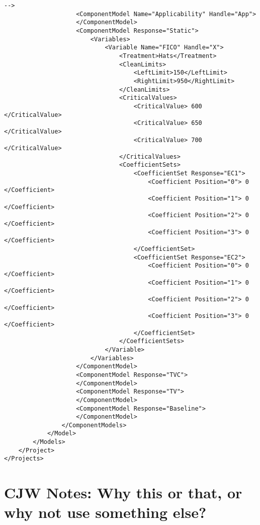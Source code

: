 \documentclass[10pt]{article}
\begin{document}
\begin{Verbatim}[fontsize=\small,baselinestretch=0.75,formatcom=\color{red}]
                    -->
                    <ComponentModel Name="Applicability" Handle="App">
                    </ComponentModel>
                    <ComponentModel Response="Static">
                        <Variables>
                            <Variable Name="FICO" Handle="X">
                                <Treatment>Hats</Treatment>
                                <CleanLimits>
                                    <LeftLimit>150</LeftLimit>
                                    <RightLimit>950</RightLimit>
                                </CleanLimits>
                                <CriticalValues>
                                    <CriticalValue> 600 </CriticalValue>
                                    <CriticalValue> 650 </CriticalValue>
                                    <CriticalValue> 700 </CriticalValue>
                                </CriticalValues>
                                <CoefficientSets>
                                    <CoefficientSet Response="EC1">
                                        <Coefficient Position="0"> 0 </Coefficient>
                                        <Coefficient Position="1"> 0 </Coefficient>
                                        <Coefficient Position="2"> 0 </Coefficient>
                                        <Coefficient Position="3"> 0 </Coefficient>
                                    </CoefficientSet>
                                    <CoefficientSet Response="EC2">
                                        <Coefficient Position="0"> 0 </Coefficient>
                                        <Coefficient Position="1"> 0 </Coefficient>
                                        <Coefficient Position="2"> 0 </Coefficient>
                                        <Coefficient Position="3"> 0 </Coefficient>
                                    </CoefficientSet>
                                </CoefficientSets>
                            </Variable>
                        </Variables>
                    </ComponentModel>
                    <ComponentModel Response="TVC">
                    </ComponentModel>
                    <ComponentModel Response="TV">
                    </ComponentModel>
                    <ComponentModel Response="Baseline">
                    </ComponentModel>
                </ComponentModels>
            </Model>
        </Models>
    </Project>
</Projects>
\end{Verbatim}



\ifcommentary


\section{\label{why} CJW Notes: Why this or that, or why not use something else?}
\end{document}
